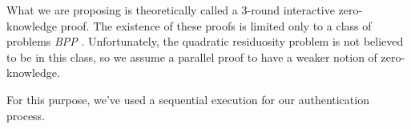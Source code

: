 What we are proposing is theoretically called a 3-round interactive zero-knowledge proof.
The existence of these proofs is limited only to a class of problems \textit{BPP} \cite{goldreich1996composition}.
Unfortunately, the quadratic residuosity problem is not believed to be in this class, so we assume a parallel proof to have a weaker notion of zero-knowledge.

For this purpose, we've used a sequential execution for our authentication process.